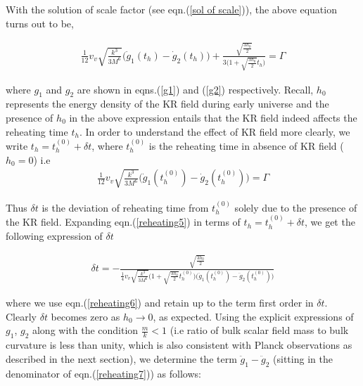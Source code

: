 \documentclass[a4paper]{article}
\begin{document}
With the solution of scale factor (see eqn.(\ref{sol of scale})), the above equation turns out to be,

\begin{eqnarray}
\frac{1}{12}v_v\sqrt{\frac{k^3}{3M^6}} \big(\dot{g}_1(t_h) - \dot{g}_2(t_h)\big)  
+ \frac{\sqrt{\frac{3h_0}{2}}}{3\bigg(1 + \sqrt{\frac{3h_0}{2}}t_h\bigg)} = \Gamma
\label{reheating5}
\end{eqnarray}

where $g_1$ and $g_2$ are shown in eqns.(\ref{g1}) and (\ref{g2}) respectively. Recall, $h_0$ represents the energy density of the KR field 
during early universe and the presence of $h_0$ in the above expression entails that the KR field indeed affects the reheating time $t_h$. 
In order to understand the effect of KR field more clearly, we write $t_h = t_h^{(0)} + \delta t$, where $t_h^{(0)}$ is the reheating time in absence 
of KR field ($h_0 = 0$) i.e
\begin{eqnarray}
 \frac{1}{12}v_v\sqrt{\frac{k^3}{3M^6}} \big(\dot{g}_1(t_h^{(0)}) - \dot{g}_2(t_h^{(0)})\big) = \Gamma
\label{reheating6}
\end{eqnarray}

Thus $\delta t$ is the deviation of reheating time from $t_h^{(0)}$ solely due to the presence of the KR field. 
Expanding eqn.(\ref{reheating5}) in terms of $t_h = t_h^{(0)} + \delta t$, we get the following expression of $\delta t$

\begin{eqnarray}
 \delta t = -\frac{\sqrt{\frac{3h_0}{2}}}
 {\frac{1}{4}v_v\sqrt{\frac{k^3}{3M^6}}\bigg(1 + \sqrt{\frac{3h_0}{2}}t_h^{(0)}\bigg)\bigg(\ddot{g}_1(t_h^{(0)}) - \ddot{g}_2(t_h^{(0)})\bigg)}
 \label{reheating7}
\end{eqnarray}

where we use eqn.(\ref{reheating6}) and retain up to the term first order in $\delta t$. Clearly $\delta t$ becomes zero as $h_0 \rightarrow 0$, 
as expected. Using the explicit expressions of $g_1$, $g_2$ along with the 
condition $\frac{m}{k} < 1$ (i.e ratio of bulk scalar field mass to bulk curvature is less than unity, which is also consistent with Planck observations 
as described in the next section), we determine the term $\ddot{g}_1 - \ddot{g}_2$ (sitting in the denominator of eqn.(\ref{reheating7})) as follows:
\end{document}
